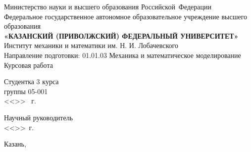 \begin{titlepage}
\begin{center}

\hfill \break

\large{Министерство науки и высшего образования Российской~Федерации}\\
\footnotesize{Федеральное государственное автономное образовательное учреждение высшего образования}\\ 
\small{\textbf{«КАЗАНСКИЙ (ПРИВОЛЖСКИЙ) ФЕДЕРАЛЬНЫЙ УНИВЕРСИТЕТ»}}\\

\hfill \break
\normalsize{Институт механики и математики им. Н. И. Лобачевского}\\

\hfill \break
\normalsize{Направление подготовки: 01.01.03 Механика и математическое моделирование}\\

\vspace{25mm}
\large{Курсовая работа}\\
\end{center}

\vspace{20mm}
\noindent
Студентка 3 курса \\
группы 05-001 \\
<<\underline{\hspace{0,75cm}}>> \underline{\hspace{2cm}}\the\year~г.

\hfill \break
Научный руководитель \\
<<\underline{\hspace{0,75cm}}>>\underline{\hspace{2cm}}\the\year~г.

\vspace{\fill}

\begin{center}
    Казань, \the\year
\end{center}
\thispagestyle{empty}

\end{titlepage}
